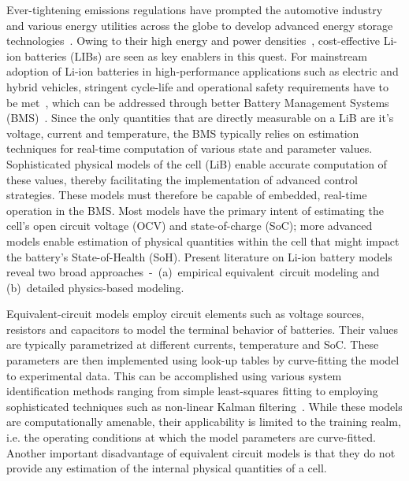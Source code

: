 Ever-tightening emissions regulations have prompted the automotive
industry and various energy utilities across the globe to develop
advanced energy storage technologies~\citep{BonnelWeissProvenza2011}.
Owing to their high energy and power densities~\citep{IbrahimIlincaPerron2008}, cost-effective Li-ion batteries (LIBs) are seen as key enablers in
this quest.
For mainstream adoption of Li-ion batteries in high-performance applications
such as electric and hybrid vehicles, stringent cycle-life and operational
safety requirements have to be met~\citep{Andrea2010}, which can
be addressed through better Battery Management Systems (BMS)~\citep{BergveldKruijtNotten2002}.
Since the only quantities that are directly measurable on a LiB are
it's voltage, current and temperature, the BMS typically relies on
estimation techniques for real-time computation of various state and
parameter values. Sophisticated physical models of the cell (LiB)
enable accurate computation of these values, thereby facilitating
the implementation of advanced control strategies. These models must
therefore be capable of embedded, real-time operation in the BMS.
Most models have the primary intent of estimating the cell\textquoteright s
open circuit voltage (OCV) and state-of-charge (SoC); more advanced
models enable estimation of physical quantities within the cell that
might impact the battery's State-of-Health (SoH). Present literature
on Li-ion battery models reveal two broad approaches~-~(a)~empirical
equivalent~circuit modeling and (b)~detailed physics-based modeling.

Equivalent-circuit models employ circuit elements such as voltage
sources, resistors and capacitors to model the terminal behavior of
batteries. Their values are typically parametrized at different currents,
temperature and SoC. These parameters are then implemented using look-up
tables by curve-fitting the model to experimental data. This can be
accomplished using various system identification methods ranging from
simple least-squares fitting to employing sophisticated techniques
such as non-linear Kalman filtering~\citep{Plett2006,SunHuZouEtAl2011}.
While these models are computationally amenable, their applicability
is limited to the training realm, i.e. the operating conditions at
which the model parameters are curve-fitted. Another important disadvantage
of equivalent circuit models is that they do not provide any estimation
of the internal physical quantities of a cell.

